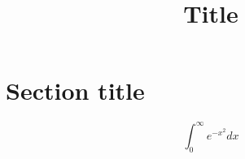 \documentclass{article}
\title{Title}
\begin{document}
  \section{Section title}

  \lipsum[1]

  \begin{equation*}
    \int_0^\infty e^{-x^2} dx
  \end{equation*}

  \lipsum[2]
\end{document}
